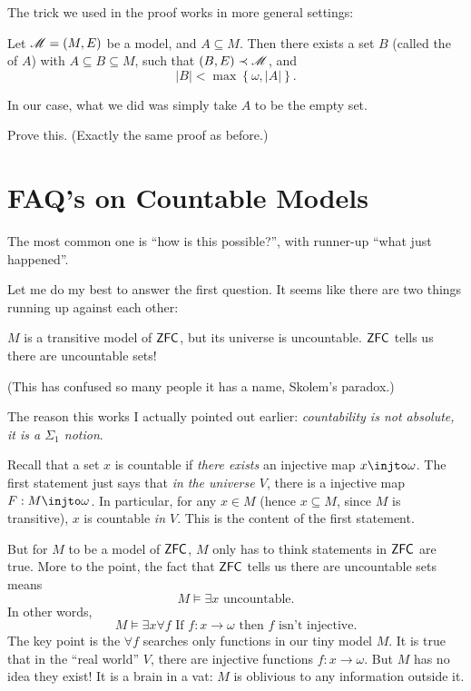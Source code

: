 The trick we used in the proof works in more general settings:
\begin{theorem}
	Let $\mathscr M = (M,E)$ be a model, and $A \subseteq M$.
	Then there exists a set $B$ (called the  of $A$)
	with $A \subseteq B \subseteq M$,
	such that $(B,E) \prec \mathscr M$, and
	\[ \left\lvert B \right\rvert < \max \left\{ \omega, \left\lvert A \right\rvert \right\}. \]
\end{theorem}
In our case, what we did was simply take $A$ to be the empty set.
\begin{ques}
	Prove this. (Exactly the same proof as before.)
\end{ques}


\section{FAQ's on Countable Models}
The most common one is ``how is this possible?'',
with runner-up ``what just happened''.

Let me do my best to answer the first question.
It seems like there are two things running up against each other:
\begin{enumerate}[(1)]
	\ii $M$ is a transitive model of $\mathsf{ZFC}$, but its universe is uncountable.
	\ii $\mathsf{ZFC}$ tells us there are uncountable sets!
\end{enumerate}
(This has confused so many people it has a name, Skolem's paradox.)

The reason this works I actually pointed out earlier:
\emph{countability is not absolute, it is a $\Sigma_1$ notion}.

Recall that a set $x$ is countable if
\emph{there exists} an injective map $x \injto \omega$.
The first statement just says that \emph{in the universe $V$},
there is a injective map $F: M \injto \omega$.
In particular, for any $x \in M$ (hence $x \subseteq M$, since $M$ is transitive),
$x$ is countable \emph{in $V$}.
This is the content of the first statement.

But for $M$ to be a model of $\mathsf{ZFC}$, $M$ only has to think statements in $\mathsf{ZFC}$ are true.
More to the point, the fact that $\mathsf{ZFC}$ tells us there are uncountable sets means
\[ M \vDash \text{$\exists x$ uncountable}. \]
In other words,
\[ M \vDash \exists x \forall f
	\text{ If $f : x \to \omega$ then $f$ isn't injective}. \]
The key point is the $\forall f$ searches only functions in our tiny model $M$.
It is true that in the ``real world'' $V$, there are injective functions $f : x \to \omega$.
But $M$ has no idea they exist!
It is a brain in a vat: $M$ is oblivious to any information outside it.

